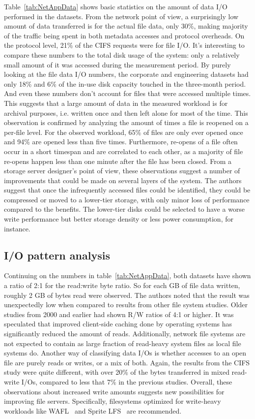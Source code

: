 Table~\ref{tab:NetAppData} shows basic statistics on the amount of data I/O performed in the datasets.
From the network point of view, a surprisingly low amount of data transferred is for the actual file data, only 30\%,
making majority of the traffic being spent in both metadata accesses and protocol overheads.
On the protocol level, 21\% of the CIFS requests were for file I/O.
It's interesting to compare these numbers to the total disk usage of the system:
only a relatively small amount of it was accessed during the measurement period.
By purely looking at the file data I/O numbers,
the corporate and engineering datasets had only 18\% and 6\% of the
in-use disk capacity touched in the three-month period.
And even these numbers don't account for files that were accessed multiple times.
This suggests that a large amount of data in the measured workload is for archival purposes,
i.e. written once and then left alone for most of the time.
This observation is confirmed by analyzing the amount of times a file is reopened on a per-file level.
For the observed workload, 65\% of files are only ever opened once and 94\% are opened less than five times.
Furthermore, re-opens of a file often occur in a short timespan and are correlated to each other,
as a majority of file re-opens happen less than one minute after the file has been closed.
From a storage server designer's point of view,
these observations suggest a number of improvements that could be made on several layers of the system.
The authors suggest that once the infrequently accessed files could be identified,
they could be compressed or moved to a lower-tier storage,
with only minor loss of performance compared to the benefits.
The lower-tier disks could be selected to have a worse write performance
but better storage density or less power consumption, for instance.

\subsection{I/O pattern analysis}
Continuing on the numbers in table~\ref{tab:NetAppData},
both datasets have shown a ratio of 2:1 for the read:write byte ratio.
So for each GB of file data written, roughly 2 GB of bytes read were observed.
The authors noted that the result was unexpectedly low when compared to results from other file system studies.
Older studies from 2000 and earlier had shown R/W ratios of 4:1 or higher.
It was speculated that improved client-side caching done by operating systems
has significantly reduced the amount of reads.
Additionally, network file systems are not expected to contain as large fraction of read-heavy system files as local file systems do.
Another way of classifying data I/Os is whether accesses to an open file are purely reads or writes, or a mix of both.
Again, the results from the CIFS study were quite different,
with over 20\% of the bytes transferred in mixed read-write I/Os,
compared to less that 7\% in the previous studies.
Overall, these observations about increased write amounts suggests new possibilities for improving file servers.
Specifically, filesystems optimized for write-heavy workloads like WAFL~\cite{WAFL} and Sprite LFS~\cite{SpriteLfs} are recommended.

